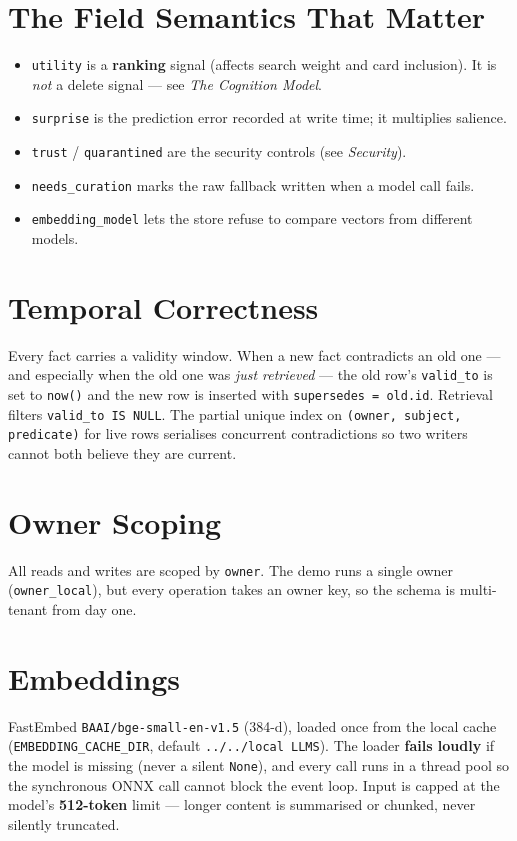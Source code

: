 \section{The Field Semantics That Matter}
\begin{itemize}
  \item \texttt{utility} is a \textbf{ranking} signal (affects search weight and card inclusion). It is
  \emph{not} a delete signal --- see \emph{The Cognition Model}.
  \item \texttt{surprise} is the prediction error recorded at write time; it multiplies salience.
  \item \texttt{trust} / \texttt{quarantined} are the security controls (see \emph{Security}).
  \item \texttt{needs\_curation} marks the raw fallback written when a model call fails.
  \item \texttt{embedding\_model} lets the store refuse to compare vectors from different models.
\end{itemize}

\section{Temporal Correctness}
Every fact carries a validity window. When a new fact contradicts an old one --- and especially when
the old one was \emph{just retrieved} --- the old row's \texttt{valid\_to} is set to \texttt{now()} and
the new row is inserted with \texttt{supersedes = old.id}. Retrieval filters
\texttt{valid\_to IS NULL}. The partial unique index on \texttt{(owner, subject, predicate)} for live
rows serialises concurrent contradictions so two writers cannot both believe they are current.

\section{Owner Scoping}
All reads and writes are scoped by \texttt{owner}. The demo runs a single owner
(\texttt{owner\_local}), but every operation takes an owner key, so the schema is multi-tenant from
day one.

\section{Embeddings}
FastEmbed \texttt{BAAI/bge-small-en-v1.5} (384-d), loaded once from the local cache
(\texttt{EMBEDDING\_CACHE\_DIR}, default \texttt{../../local LLMS}). The loader \textbf{fails loudly}
if the model is missing (never a silent \texttt{None}), and every call runs in a thread pool so the
synchronous ONNX call cannot block the event loop. Input is capped at the model's \textbf{512-token}
limit --- longer content is summarised or chunked, never silently truncated.
